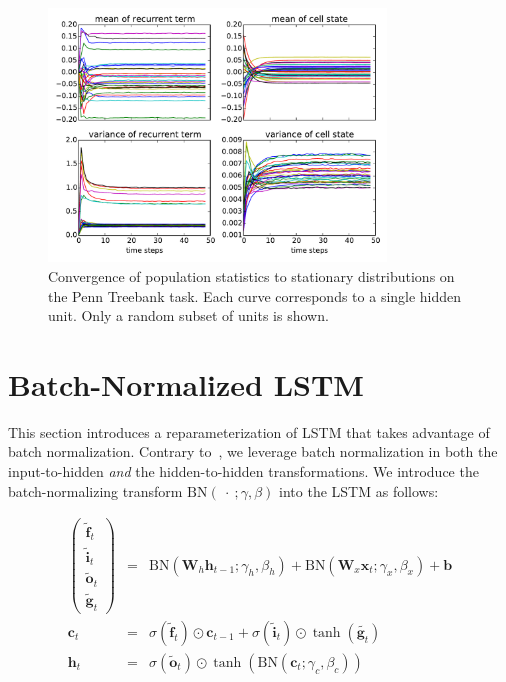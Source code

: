 \documentclass{article} %
\newcommand{\vect}[1]{\mathbf{#1}}
\newcommand{\mat}[1]{\mathbf{#1}}
\newcommand{\ewprod}{\odot}
\begin{document}
\begin{figure}[!ht]
\center
\includegraphics[width=0.8\textwidth]{figures/popstat_stationarity.pdf}
\caption{Convergence of population statistics to stationary distributions on the 
Penn Treebank task. Each curve corresponds to a single hidden unit. Only a random subset of units is shown.}
\label{fig:popstat_stationarity}
\end{figure}



\section{Batch-Normalized LSTM}
\label{sec:recurrent-batch-normalization}

This section introduces a reparameterization of LSTM that takes advantage of 
batch normalization. Contrary to~\citet{cesar, baidu}, we 
leverage batch normalization in both the input-to-hidden \emph{and} the hidden-to-hidden transformations.
We introduce the batch-normalizing transform $\mathrm{BN}(\ \cdot\ ; \gamma, \beta)$ 
into the LSTM as follows:

\begin{eqnarray}
\left(\begin{array}{ccc}
\tilde{\vect{f}}_t \\
\tilde{\vect{i}}_t \\
\tilde{\vect{o}}_t \\
\tilde{\vect{g}}_t
\end{array}\right)
 &=&
 \mathrm{BN} (\mat{W}_h \vect{h}_{t-1}; \gamma_h, \beta_h) +
 \mathrm{BN} (\mat{W}_x \vect{x}_t   ; \gamma_x, \beta_x) +
 \vect{b}
\\
\vect{c}_t &=& \sigma(\tilde{\vect{f}}_t) \ewprod \vect{c}_{t-1} +
               \sigma(\tilde{\vect{i}}_t) \ewprod \tanh(\tilde{\vect{g}_t}) \\
\vect{h}_t &=& \sigma(\tilde{\vect{o}}_t) \ewprod \tanh(
 \mathrm{BN} (\vect{c}_t; \gamma_c, \beta_c)
)
\end{eqnarray}
\end{document}
